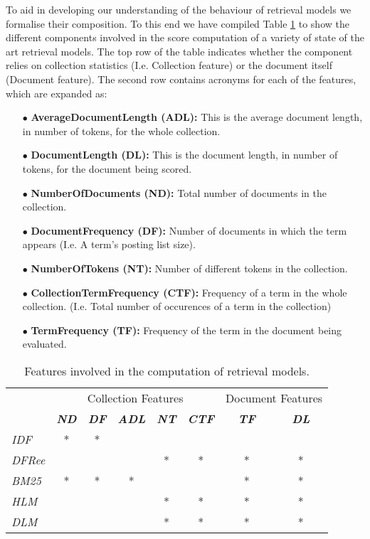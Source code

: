 To aid in developing our understanding of the behaviour of retrieval models we formalise their composition. To this end we have compiled Table \ref{modelfeatures} to show the different components involved in the score computation of a variety of state of the art retrieval models. The top row of the table indicates whether the component relies on collection statistics (I.e. Collection feature) or the document itself (Document feature). The second row contains acronyms for each of the features, which are expanded as: 

\begin{itemize}
\item [$\bullet$] \textbf{AverageDocumentLength (ADL):} This is the average document length, in number of tokens, for the whole collection.
\item [$\bullet$] \textbf{DocumentLength (DL):} This is the document length, in number of tokens, for the document being scored.
\item [$\bullet$] \textbf{NumberOfDocuments (ND):} Total number of documents in the collection. 
\item [$\bullet$] \textbf{DocumentFrequency (DF):} Number of documents in which the term appears (I.e. A term's posting list size).
\item [$\bullet$] \textbf{NumberOfTokens (NT):} Number of different tokens in the collection.
\item [$\bullet$] \textbf{CollectionTermFrequency (CTF):} Frequency of a term in the whole collection. (I.e. Total number of occurences of a term in the collection)
\item [$\bullet$] \textbf{TermFrequency (TF):} Frequency of the term in the document being evaluated.
\end{itemize}

\begin{table}[h!]
	\caption{Features involved in the computation of retrieval models.}
	\centering
	\begin{tabular}{|l|c|c|c|c|c||c|c|} 
		\cline{2- 8}
		\multicolumn{1}{c|}{}& \multicolumn{5}{c||}{Collection Features} &  \multicolumn{2}{c|}{Document Features} \tabularnewline
		\cline{2- 8}
		\multicolumn{1}{c|}{}
		& \textit{\textbf{ND} } & \textit{\textbf{DF} } & \textit{\textbf{ADL} } & \textit{\textbf{NT} } 
		& \textit{\textbf{CTF} } & \textit{\textbf{TF} } & \textit{\textbf{DL} } \tabularnewline \hline
		\textit{IDF} 	& * &  *&  	&   &  	&	&   \tabularnewline \hline
		\textit{DFRee} 	&   &   &   & * & * &*	&* \tabularnewline \hline
		\textit{BM25}	& * &  *& * &   &  	&*	&* \tabularnewline \hline
		\textit{HLM} 	&   &   &  	& * & * &*	&* \tabularnewline \hline
		\textit{DLM} 	&   &   &  	& * & * &*	&* \tabularnewline \hline
	\end{tabular}
	\label{modelfeatures}
\end{table}

